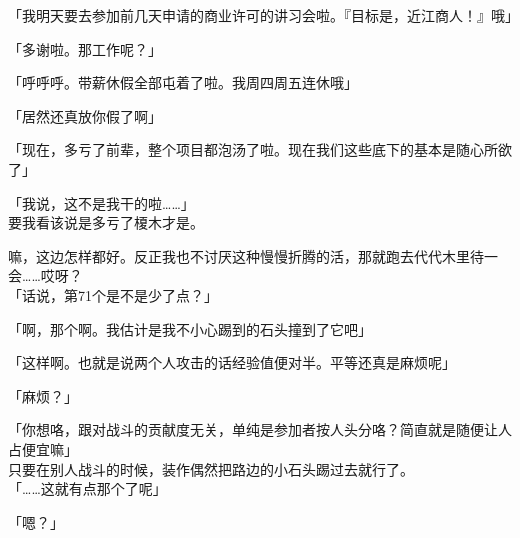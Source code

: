 「我明天要去参加前几天申请的商业许可的讲习会啦。『目标是，近江商人！』哦」

「多谢啦。那工作呢？」

「呼呼呼。带薪休假全部屯着了啦。我周四周五连休哦」

「居然还真放你假了啊」

「现在，多亏了前辈，整个项目都泡汤了啦。现在我们这些底下的基本是随心所欲了」

「我说，这不是我干的啦……」\\

要我看该说是多亏了榎木才是。

嘛，这边怎样都好。反正我也不讨厌这种慢慢折腾的活，那就跑去代代木里待一会……哎呀？\\

「话说，第71个是不是少了点？」

「啊，那个啊。我估计是我不小心踢到的石头撞到了它吧」

「这样啊。也就是说两个人攻击的话经验值便对半。平等还真是麻烦呢」

「麻烦？」

「你想咯，跟对战斗的贡献度无关，单纯是参加者按人头分咯？简直就是随便让人占便宜嘛」\\

只要在别人战斗的时候，装作偶然把路边的小石头踢过去就行了。\\

「……这就有点那个了呢」

「嗯？」

